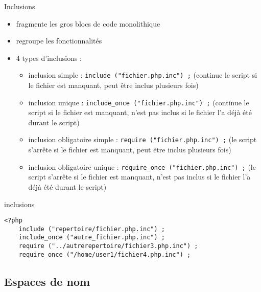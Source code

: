 \begin{frame}[containsverbatim]{Inclusions}
	\begin{itemize}
		\item fragmente les gros blocs de code monolithique
		\item regroupe les fonctionnalités
		\item 4 types d'inclusions :
		\begin{itemize}
			\item inclusion simple : \lstinline$include ("fichier.php.inc") ;$ (continue le script si le fichier est manquant, peut être inclus plusieurs fois)
			\item inclusion unique : \lstinline$include_once ("fichier.php.inc") ;$ (continue le script si le fichier est manquant, n'est pas inclus si le fichier l'a déjà été durant le script)
			\item inclusion obligatoire simple : \lstinline$require ("fichier.php.inc") ;$ (le script s'arrête si le fichier est manquant, peut être inclus plusieurs fois)
			\item inclusion obligatoire unique : \lstinline$require_once ("fichier.php.inc") ;$ (le script s'arrête si le fichier est manquant, n'est pas inclus si le fichier l'a déjà été durant le script)
		\end{itemize}
	\end{itemize}
	\begin{block}{inclusions}
		\begin{lstlisting}
<?php
	include ("repertoire/fichier.php.inc") ;
	include_once ("autre_fichier.php.inc") ;
	require ("../autrerepertoire/fichier3.php.inc") ;
	require_once ("/home/user1/fichier4.php.inc") ;
		\end{lstlisting}
	\end{block}
\end{frame}


\subsection{Espaces de nom}

